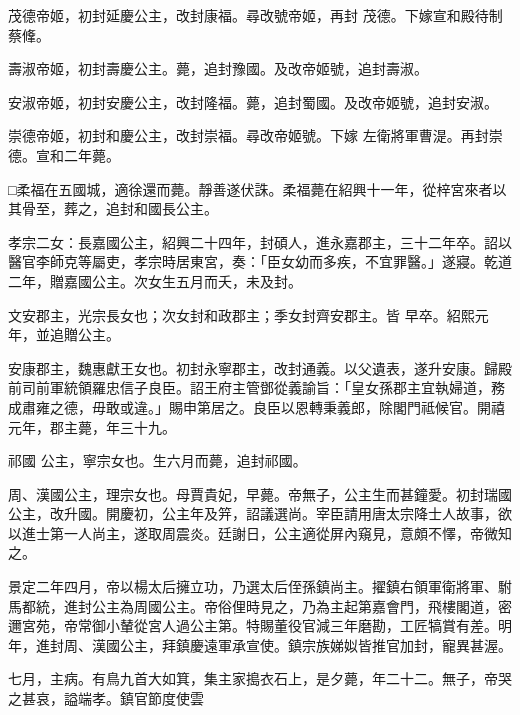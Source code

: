 \begin{pinyinscope}
 茂德帝姬，初封延慶公主，改封康福。尋改號帝姬，再封
 茂德。下嫁宣和殿待制蔡鞗。



 壽淑帝姬，初封壽慶公主。薨，追封豫國。及改帝姬號，追封壽淑。



 安淑帝姬，初封安慶公主，改封隆福。薨，追封蜀國。及改帝姬號，追封安淑。



 崇德帝姬，初封和慶公主，改封崇福。尋改帝姬號。下嫁
 左衛將軍曹湜。再封崇德。宣和二年薨。



 □柔福在五國城，適徐還而薨。靜善遂伏誅。柔福薨在紹興十一年，從梓宮來者以其骨至，葬之，追封和國長公主。



 孝宗二女：長嘉國公主，紹興二十四年，封碩人，進永嘉郡主，三十二年卒。詔以醫官李師克等屬吏，孝宗時居東宮，奏：「臣女幼而多疾，不宜罪醫。」遂寢。乾道二年，贈嘉國公主。次女生五月而夭，未及封。



 文安郡主，光宗長女也；次女封和政郡主；季女封齊安郡主。皆
 早卒。紹熙元年，並追贈公主。



 安康郡主，魏惠獻王女也。初封永寧郡主，改封通義。以父遺表，遂升安康。歸殿前司前軍統領羅忠信子良臣。詔王府主管鄧從義諭旨：「皇女孫郡主宜執婦道，務成肅雍之德，毋敢或違。」賜申第居之。良臣以恩轉秉義郎，除閣門祗候官。開禧元年，郡主薨，年三十九。



 祁國
 公主，寧宗女也。生六月而薨，追封祁國。



 周、漢國公主，理宗女也。母賈貴妃，早薨。帝無子，公主生而甚鐘愛。初封瑞國公主，改升國。開慶初，公主年及笄，詔議選尚。宰臣請用唐太宗降士人故事，欲以進士第一人尚主，遂取周震炎。廷謝日，公主適從屏內窺見，意頗不懌，帝微知之。



 景定二年四月，帝以楊太后擁立功，乃選太后侄孫鎮尚主。擢鎮右領軍衛將軍、駙馬都統，進封公主為周國公主。帝俗俚時見之，乃為主起第嘉會門，飛樓閣道，密邇宮苑，帝常御小輦從宮人過公主第。特賜董役官減三年磨勘，工匠犒賞有差。明年，進封周、漢國公主，拜鎮慶遠軍承宣使。鎮宗族娣姒皆推官加封，寵異甚渥。



 七月，主病。有鳥九首大如箕，集主家搗衣石上，是夕薨，年二十二。無子，帝哭之甚哀，謚端孝。鎮官節度使雲



\end{pinyinscope}